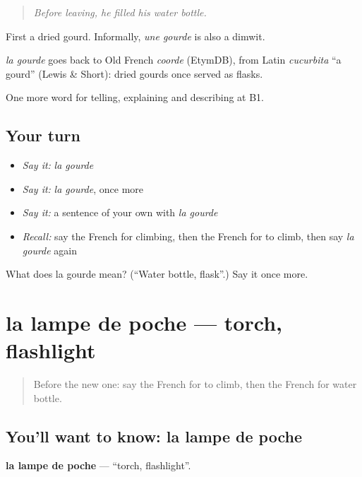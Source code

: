 \begin{quote}
\emph{Before leaving, he filled his water bottle.}
\end{quote}

First a dried gourd. Informally, \emph{une gourde} is also a dimwit.

\begin{cousinweb}
\emph{la gourde} goes back to Old French \emph{coorde} (EtymDB), from Latin \emph{cucurbita} \textquotedblleft{}a gourd\textquotedblright{} (Lewis \& Short): dried gourds once served as flasks.
\end{cousinweb}

\begin{grammarlens}[title={What you've built}]
One more word for telling, explaining and describing at B1.
\end{grammarlens}

\subsection*{Your turn}
\begin{itemize}
\raggedright
  \item \emph{Say it:} \emph{la gourde}
  \item \emph{Say it:} \emph{la gourde}, once more
  \item \emph{Say it:} a sentence of your own with \emph{la gourde}
  \item \emph{Recall:} say the French for climbing, then the French for to climb, then say \emph{la gourde} again
\end{itemize}

\begin{tcolorbox}[breakable,colback=teal!4,colframe=teal!35!black,title={Before you move on}]
What does la gourde mean? (\textquotedblleft{}Water bottle, flask\textquotedblright{}.) Say it once more.
\end{tcolorbox}
\section[la lampe de poche]{la lampe de poche — torch, flashlight}

\label{lesson:FR-C498-lampe-de-poche}



\begin{quote}
Before the new one: say the French for to climb, then the French for water bottle.
\end{quote}

\subsection*{You'll want to know: la lampe de poche}
\textbf{la lampe de poche} — \textquotedblleft{}torch, flashlight\textquotedblright{}.

